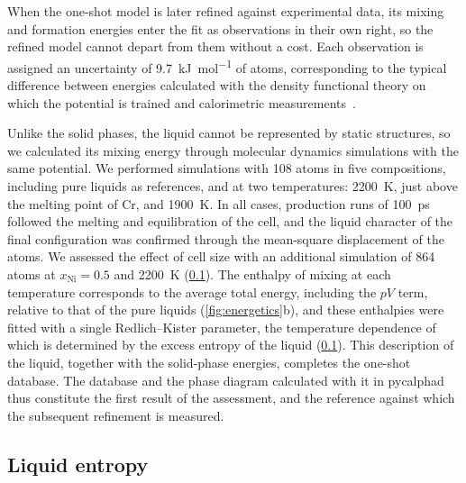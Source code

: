 When the one-shot model is later refined against experimental data, its mixing and formation energies enter the fit as observations in their own right, so the refined model cannot depart from them without a cost. Each observation is assigned an uncertainty of \qty{9.7}{\kilo\joule\per\mole} of atoms, corresponding to the typical difference between energies calculated with the density functional theory on which the potential is trained and calorimetric measurements~\cite{kirklin2015oqmd,arroyave2026orchid}.

Unlike the solid phases, the liquid cannot be represented by static structures, so we calculated its mixing energy through molecular dynamics simulations with the same potential. We performed simulations with 108 atoms in five compositions, including pure liquids as references, and at two temperatures: \qty{2200}{\K}, just above the melting point of Cr, and \qty{1900}{\K}. In all cases, production runs of \qty{100}{\ps} followed the melting and equilibration of the cell, and the liquid character of the final configuration was confirmed through the mean-square displacement of the atoms. We assessed the effect of cell size with an additional simulation of 864 atoms at $x_{\mathrm{Ni}} = 0.5$ and \qty{2200}{\K} (\cref{sec:methods:entropy}). The enthalpy of mixing at each temperature corresponds to the average total energy, including the $pV$ term, relative to that of the pure liquids (\cref{fig:energetics}b), and these enthalpies were fitted with a single Redlich--Kister parameter, the temperature dependence of which is determined by the excess entropy of the liquid (\cref{sec:methods:entropy}). This description of the liquid, together with the solid-phase energies, completes the one-shot database. The database and the phase diagram calculated with it in pycalphad~\cite{otis2017pycalphad} thus constitute the first result of the assessment, and the reference against which the subsequent refinement is measured.

\subsection{Liquid entropy}
\label{sec:methods:entropy}

